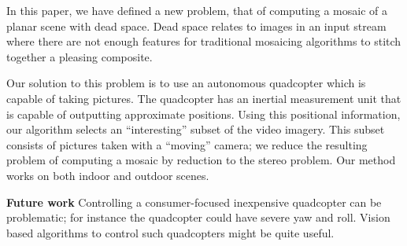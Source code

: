 \documentclass[10pt,twocolumn,letterpaper]{article}
\begin{document}
In this paper, we have defined a new problem, that of computing a
mosaic of a planar scene with dead space.  Dead space relates to images
in an input stream where there are not enough features for traditional
mosaicing algorithms to stitch together a pleasing composite.  

Our solution to this problem is to use an autonomous quadcopter which
is capable of taking pictures.  The quadcopter has an inertial
measurement unit that is capable of outputting approximate
positions. Using this positional information, our algorithm selects an
``interesting'' subset of the video imagery.  This subset consists of
pictures taken with a ``moving'' camera; we reduce the resulting
problem of computing a mosaic by reduction to the stereo problem.  Our
method works on both indoor and outdoor scenes.

{\bf Future work} Controlling a consumer-focused inexpensive
quadcopter can be problematic; for instance the quadcopter could have
severe yaw and roll.  Vision based algorithms to control such
quadcopters might be quite useful.
\end{document}
